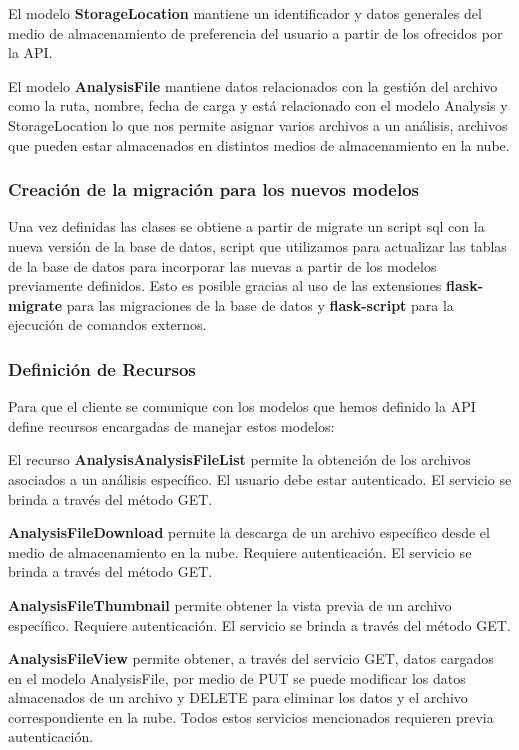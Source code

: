 \documentclass[a4paper,12pt]{article}
\begin{document}
El modelo \textbf{StorageLocation} mantiene un identificador y datos generales del medio de almacenamiento de preferencia del usuario a partir de los ofrecidos por la API.

El modelo \textbf{AnalysisFile} mantiene datos relacionados con la gestión del archivo como la ruta, nombre, fecha de carga y está relacionado con el modelo Analysis y StorageLocation lo que nos permite asignar varios archivos a un análisis, archivos que pueden estar almacenados en distintos medios de almacenamiento en la nube.

\subsubsection{Creación de la migración para los nuevos modelos}

Una vez definidas las clases se obtiene a partir de migrate un script sql con la nueva versión de la base de datos, script que utilizamos para actualizar las tablas de la base de datos para incorporar las nuevas a partir de los modelos previamente definidos. Esto es posible gracias al uso de las extensiones \textbf{flask-migrate} para las migraciones de la base de datos y \textbf{flask-script} para la ejecución de comandos externos.

\subsubsection{Definición de Recursos}

Para que el cliente se comunique con los modelos que hemos definido la API define recursos encargadas de manejar estos modelos:

El recurso \textbf{AnalysisAnalysisFileList} permite la obtención de los archivos asociados a un análisis específico. El usuario debe estar autenticado. El servicio se brinda a través del método GET.

\textbf{AnalysisFileDownload} permite la descarga de un archivo específico desde el medio de almacenamiento en la nube. Requiere autenticación. El servicio se brinda a través del método GET.

\textbf{AnalysisFileThumbnail} permite obtener la vista previa de un archivo específico. Requiere autenticación. El servicio se brinda a través del método GET.

\textbf{AnalysisFileView} permite obtener, a través del servicio GET, datos cargados en el modelo AnalysisFile, por medio de PUT se  puede modificar los datos almacenados de un archivo y DELETE para eliminar los datos y el archivo correspondiente en la nube. Todos estos servicios mencionados requieren previa autenticación.
\end{document}
